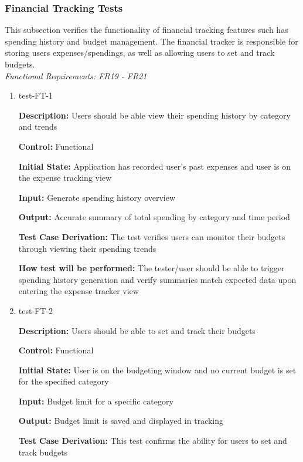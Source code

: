 \documentclass[12pt, titlepage]{article}
\begin{document}
\subsubsection{Financial Tracking Tests}

This subsection verifies the functionality of financial tracking features such has spending history and budget management. The financial tracker is responsible for storing users expenses/spendings, as well as allowing users to set and track budgets.\\
\textit{Functional Requirements: FR19 - FR21}

\begin{enumerate}

\item{test-FT-1\\}

\textbf{Description:} Users should be able view their spending history by category and trends

\textbf{Control:} Functional

\textbf{Initial State:} Application has recorded user's past expenses and user is on the expense tracking view

\textbf{Input:} Generate spending history overview

\textbf{Output:} Accurate summary of total spending by category and time period

\textbf{Test Case Derivation:} The test verifies users can monitor their budgets through viewing their spending trends

\textbf{How test will be performed:} The tester/user should be able to trigger spending history generation and verify summaries match expected data upon entering the expense tracker view

\item{test-FT-2\\}

\textbf{Description:} Users should be able to set and track their budgets

\textbf{Control:} Functional

\textbf{Initial State:} User is on the budgeting window and no current budget is set for the specified category

\textbf{Input:} Budget limit for a specific category

\textbf{Output:} Budget limit is saved and displayed in tracking

\textbf{Test Case Derivation:} This test confirms the ability for users to set and track budgets


\end{enumerate}
\end{document}
